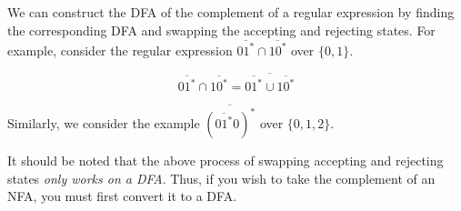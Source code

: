 We can construct the DFA of the complement of a regular expression by finding the corresponding DFA and swapping the accepting and rejecting states. For example, consider the regular expression \(\overline{01^*}\cap\overline{10^*}\) over \( \{0, 1\} \). 

\[\overline{01^*}\cap\overline{10^*}=\overline{\overline{01^*}\cup\overline{10^*}}\]

Similarly, we consider the example \(\overline{{(\overline{01^*}0)}^*}\) over \( \{0,1,2\} \).

It should be noted that the above process of swapping accepting and rejecting states \textit{only works on a DFA}. Thus, if you wish to take the complement of an NFA, you must first convert it to a DFA\@. 

